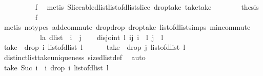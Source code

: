 \begin{isabellebody}
\ \ \ \ \ \ \ \ \isamarkupfalse%
\ f{}\ \isamarkupfalse%
\ {\isacharparenleft}metis\ Sliceable{\isacharunderscore}dlist{\isachardot}list{\isacharunderscore}of{\isacharunderscore}dlist{\isacharunderscore}slice\ drop{\isacharunderscore}take\ take{\isacharunderscore}take{\isacharparenright}\isanewline
\ \ \ \ \ \ \isamarkupfalse%
\ {\isacharquery}thesis\isanewline
\ \ \ \ \ \ \ \ \isamarkupfalse%
\ f{}\ \isamarkupfalse%
\ {\isacharparenleft}metis\ {\isacharparenleft}no{\isacharunderscore}types{\isacharparenright}\ add{\isachardot}commute\ drop{\isacharunderscore}drop\ drop{\isacharunderscore}take\ list{\isacharunderscore}of{\isacharunderscore}dlist{\isacharunderscore}simps{\isacharparenleft}{}{\isacharparenright}\ min{\isachardot}commute{\isacharparenright}\isanewline
\ \ \ \ \isamarkupfalse%
\isanewline
\ \ \isamarkupfalse%
\isanewline
\ \ \isamarkupfalse%
\ l{\isacharcolon}{\isacharcolon}{\isachardoublequoteopen}{\isacharprime}a\ dlist{\isachardoublequoteclose}\ \ i\ \ j\isanewline
\ \ \isamarkupfalse%
\ {\isachardoublequoteopen}disjoint\ l{\isachardoublequoteclose}\ {\isachardoublequoteopen}i{\isasymnoteq}j{\isachardoublequoteclose}\ {\isachardoublequoteopen}i\ {\isacharless}\ {\isacharparenleft}{\isacharhash}l{\isacharparenright}{\isachardoublequoteclose}\ {\isachardoublequoteopen}j\ {\isacharless}\ {\isacharparenleft}{\isacharhash}l{\isacharparenright}{\isachardoublequoteclose}\isanewline
\ \ \isamarkupfalse%
\ {\isachardoublequoteopen}take\ {}\ {\isacharparenleft}drop\ i\ {\isacharparenleft}list{\isacharunderscore}of{\isacharunderscore}dlist\ l{\isacharparenright}{\isacharparenright}\ {\isasymnoteq}\ \isanewline
\ \ \ \ take\ {}\ {\isacharparenleft}drop\ j\ {\isacharparenleft}list{\isacharunderscore}of{\isacharunderscore}dlist\ l{\isacharparenright}{\isacharparenright}{\isachardoublequoteclose}\isanewline
\ \ \ \ \isamarkupfalse%
\ distinct{\isacharunderscore}list{\isacharunderscore}take{\isacharunderscore}{}{\isacharunderscore}uniqueness\ size{\isacharunderscore}dlist{\isacharunderscore}def\ \isamarkupfalse%
\ auto\isanewline
\ \ \isamarkupfalse%
\ {\isachardoublequoteopen}take\ {\isacharparenleft}Suc\ i\ {\isacharminus}\ i{\isacharparenright}\ {\isacharparenleft}drop\ i\ {\isacharparenleft}list{\isacharunderscore}of{\isacharunderscore}dlist\ l{\isacharparenright}{\isacharparenright}\ {\isasymnoteq}\ \isanewline

\end{isabellebody}

